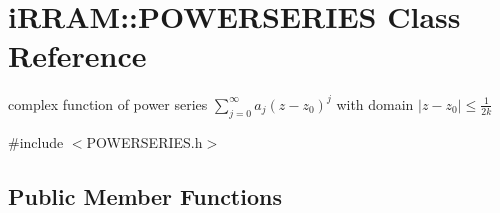 \hypertarget{classi_r_r_a_m_1_1_p_o_w_e_r_s_e_r_i_e_s}{}\section{i\+R\+R\+AM\+::P\+O\+W\+E\+R\+S\+E\+R\+I\+ES Class Reference}
\label{classi_r_r_a_m_1_1_p_o_w_e_r_s_e_r_i_e_s}


complex function of power series $ \displaystyle\sum_{j=0}^{\infty}{a_j (z - z_0)^j} $ with domain $ |z - z_0| \leq \frac{1}{2k}$  




{\ttfamily \#include $<$P\+O\+W\+E\+R\+S\+E\+R\+I\+E\+S.\+h$>$}

\subsection*{Public Member Functions}
